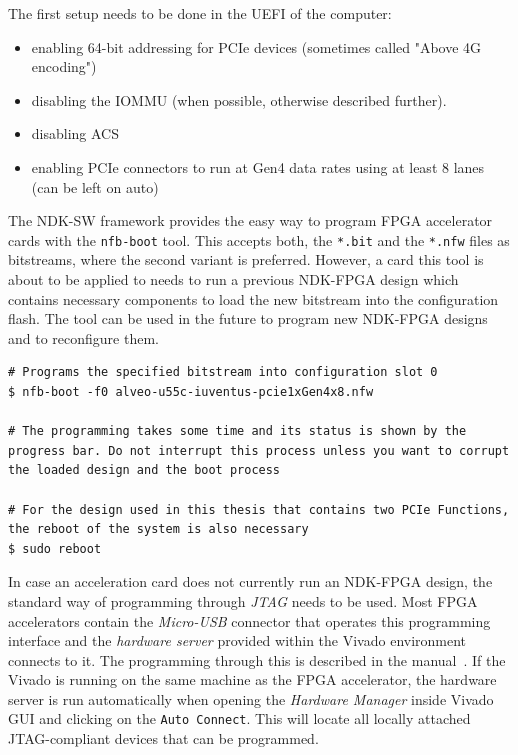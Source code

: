 The first setup needs to be done in the UEFI of the computer:
\begin{itemize}
    \item enabling 64-bit addressing for PCIe devices (sometimes called "Above 4G encoding")
    \item disabling the \ac{IOMMU} (when possible, otherwise described further).
    \item disabling \ac{ACS}
    \item enabling PCIe connectors to run at Gen4 data rates using at least 8 lanes (can be left on
    auto)
\end{itemize}

The NDK-SW framework provides the easy way to program FPGA accelerator cards with the
\verb|nfb-boot| tool. This accepts both, the \verb|*.bit| and the \verb|*.nfw| files as bitstreams,
where the second variant is preferred. However, a card this tool is about to be applied to needs to
run a previous NDK-FPGA design which contains necessary components to load the new bitstream into
the configuration flash. The tool can be used in the future to program new NDK-FPGA designs and to
reconfigure them.

\begin{lstlisting}[caption={Programming using the nfb-boot tool}]
# Programs the specified bitstream into configuration slot 0
$ nfb-boot -f0 alveo-u55c-iuventus-pcie1xGen4x8.nfw

# The programming takes some time and its status is shown by the progress bar. Do not interrupt this process unless you want to corrupt the loaded design and the boot process

# For the design used in this thesis that contains two PCIe Functions, the reboot of the system is also necessary
$ sudo reboot
\end{lstlisting}

In case an acceleration card does not currently run an NDK-FPGA design, the standard way of
programming through \emph{JTAG} needs to be used. Most FPGA accelerators contain the
\emph{Micro-USB} connector that operates this programming interface and the \emph{hardware server}
provided within the Vivado environment connects to it. The programming through this is described in
the manual~\cite{vivado_programming}. If the Vivado is running on the same machine as the FPGA
accelerator, the hardware server is run automatically when opening the \emph{Hardware Manager}
inside Vivado GUI and clicking on the \verb|Auto Connect|. This will locate all locally attached
JTAG-compliant devices that can be programmed.

